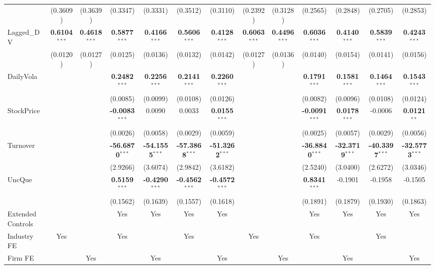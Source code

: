 \documentclass[11pt,a4paper]{article}
\begin{document}
\begin{table}[htbp]
\begin{tabular}{lcccccccccccc}
 & (0.3609) & (0.3639) & (0.3347) & (0.3331) & (0.3512) & (0.3110) & (0.2392) & (0.3128) & (0.2565) & (0.2848) & (0.2705) & (0.2853) \\
Lagged\_DV & \textbf{0.6104}$^{***}$ & \textbf{0.4618}$^{***}$ & \textbf{0.5877}$^{***}$ & \textbf{0.4166}$^{***}$ & \textbf{0.5606}$^{***}$ & \textbf{0.4128}$^{***}$ & \textbf{0.6063}$^{***}$ & \textbf{0.4496}$^{***}$ & \textbf{0.6036}$^{***}$ & \textbf{0.4140}$^{***}$ & \textbf{0.5839}$^{***}$ & \textbf{0.4243}$^{***}$ \\
 & (0.0120) & (0.0127) & (0.0125) & (0.0136) & (0.0132) & (0.0142) & (0.0127) & (0.0136) & (0.0140) & (0.0154) & (0.0141) & (0.0156) \\
DailyVola &  &  & \textbf{0.2482}$^{***}$ & \textbf{0.2256}$^{***}$ & \textbf{0.2141}$^{***}$ & \textbf{0.2260}$^{***}$ &  &  & \textbf{0.1791}$^{***}$ & \textbf{0.1581}$^{***}$ & \textbf{0.1464}$^{***}$ & \textbf{0.1543}$^{***}$ \\
 &  &  & (0.0085) & (0.0099) & (0.0108) & (0.0126) &  &  & (0.0082) & (0.0096) & (0.0108) & (0.0124) \\
StockPrice &  &  & \textbf{-0.0083}$^{***}$ & 0.0090 & 0.0033 & \textbf{0.0155}$^{***}$ &  &  & \textbf{-0.0091}$^{***}$ & \textbf{0.0178}$^{***}$ & -0.0006 & \textbf{0.0121}$^{**}$ \\
 &  &  & (0.0026) & (0.0058) & (0.0029) & (0.0059) &  &  & (0.0025) & (0.0057) & (0.0029) & (0.0056) \\
Turnover &  &  & \textbf{-56.6870}$^{***}$ & \textbf{-54.1555}$^{***}$ & \textbf{-57.3868}$^{***}$ & \textbf{-51.3262}$^{***}$ &  &  & \textbf{-36.8840}$^{***}$ & \textbf{-32.3719}$^{***}$ & \textbf{-40.3397}$^{***}$ & \textbf{-32.5773}$^{***}$ \\
 &  &  & (2.9266) & (3.6074) & (2.9842) & (3.6182) &  &  & (2.5240) & (3.0400) & (2.6272) & (3.0346) \\
UncQue &  &  & \textbf{0.5159}$^{***}$ & \textbf{-0.4290}$^{***}$ & \textbf{-0.4562}$^{***}$ & \textbf{-0.4572}$^{***}$ &  &  & \textbf{0.8341}$^{***}$ & -0.1901 & -0.1958 & -0.1505 \\
 &  &  & (0.1562) & (0.1639) & (0.1557) & (0.1618) &  &  & (0.1891) & (0.1879) & (0.1930) & (0.1863) \\
\midrule
Extended Controls &  &  & Yes & Yes & Yes & Yes &  &  & Yes & Yes & Yes & Yes \\
Industry FE & Yes &  & Yes &  & Yes &  & Yes &  & Yes &  & Yes &  \\
Firm FE &  & Yes &  & Yes &  & Yes &  & Yes &  & Yes &  & Yes \\

\end{tabular}
\end{table}
\end{document}
